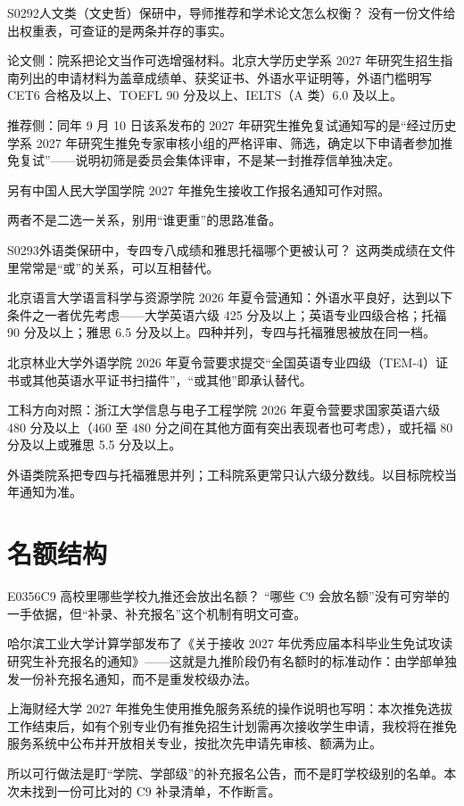 \begin{qa}{S0292}{人文类（文史哲）保研中，导师推荐和学术论文怎么权衡？}
没有一份文件给出权重表，可查证的是两条并存的事实。

论文侧：院系把论文当作可选增强材料。北京大学历史学系 2027 年研究生招生指南列出的申请材料为盖章成绩单、获奖证书、外语水平证明等，外语门槛明写 CET6 合格及以上、TOEFL 90 分及以上、IELTS（A 类）6.0 及以上。

推荐侧：同年 9 月 10 日该系发布的 2027 年研究生推免复试通知写的是“经过历史学系 2027 年研究生推免专家审核小组的严格评审、筛选，确定以下申请者参加推免复试”——说明初筛是委员会集体评审，不是某一封推荐信单独决定。

另有中国人民大学国学院 2027 年推免生接收工作报名通知可作对照。

两者不是二选一关系，别用“谁更重”的思路准备。
\end{qa}

\begin{qa}{S0293}{外语类保研中，专四专八成绩和雅思托福哪个更被认可？}
这两类成绩在文件里常常是“或”的关系，可以互相替代。

北京语言大学语言科学与资源学院 2026 年夏令营通知：外语水平良好，达到以下条件之一者优先考虑——大学英语六级 425 分及以上；英语专业四级合格；托福 90 分及以上；雅思 6.5 分及以上。四种并列，专四与托福雅思被放在同一档。

北京林业大学外语学院 2026 年夏令营要求提交“全国英语专业四级（TEM-4）证书或其他英语水平证书扫描件”，“或其他”即承认替代。

工科方向对照：浙江大学信息与电子工程学院 2026 年夏令营要求国家英语六级 480 分及以上（460 至 480 分之间在其他方面有突出表现者也可考虑），或托福 80 分及以上或雅思 5.5 分及以上。

外语类院系把专四与托福雅思并列；工科院系更常只认六级分数线。以目标院校当年通知为准。
\end{qa}

\section{名额结构}
\begin{qa}{E0356}{C9 高校里哪些学校九推还会放出名额？}
“哪些 C9 会放名额”没有可穷举的一手依据，但“补录、补充报名”这个机制有明文可查。

哈尔滨工业大学计算学部发布了《关于接收 2027 年优秀应届本科毕业生免试攻读研究生补充报名的通知》——这就是九推阶段仍有名额时的标准动作：由学部单独发一份补充报名通知，而不是重发校级办法。

上海财经大学 2027 年推免生使用推免服务系统的操作说明也写明：本次推免选拔工作结束后，如有个别专业仍有推免招生计划需再次接收学生申请，我校将在推免服务系统中公布并开放相关专业，按批次先申请先审核、额满为止。

所以可行做法是盯“学院、学部级”的补充报名公告，而不是盯学校级别的名单。本次未找到一份可比对的 C9 补录清单，不作断言。
\end{qa}

